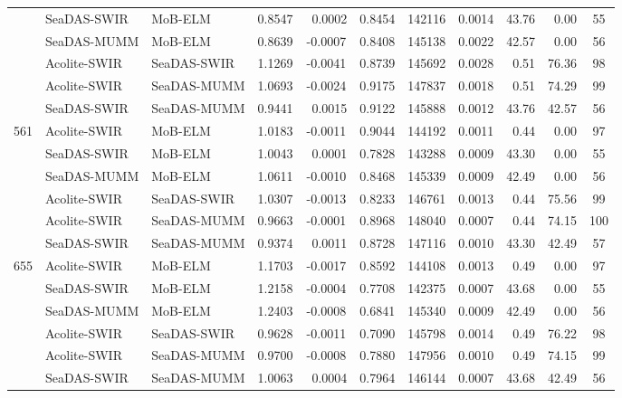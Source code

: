 \documentclass[]{spie}  %
\begin{document}
\begin{table}[!ht]
\begin{tabular}{cllcccccccc}
			&   SeaDAS-SWIR   &  MoB-ELM      &	0.8547 	&	~0.0002 &	0.8454 	&	142116  &	0.0014  &  43.76    	& ~0.00      		   &   55   	 \\
			&   SeaDAS-MUMM   &  MoB-ELM      &	0.8639 	&	-0.0007 &	0.8408 	&	145138  &	0.0022  &  42.57    	& ~0.00      		   &   56   	 \\ 
			&   Acolite-SWIR  &  SeaDAS-SWIR  &	1.1269 	&	-0.0041 &	0.8739 	&	145692  &	0.0028  &  ~0.51     	& 76.36     		   &   98   	 \\
			&   Acolite-SWIR  &  SeaDAS-MUMM  &	1.0693 	&	-0.0024 &	0.9175 	&	147837  &	0.0018  &  ~0.51     	& 74.29     		   &   99   	 \\
			&   SeaDAS-SWIR   &  SeaDAS-MUMM  &	0.9441 	&	~0.0015 &	0.9122 	&	145888  &	0.0012  &  43.76    	& 42.57     		   &   56   	 \\ \hline
\multirow{6}{*}{561}&Acolite-SWIR&  MoB-ELM   &	1.0183 	&	-0.0011 &	0.9044 	&	144192  &	0.0011  &  ~0.44     	& ~0.00      		   &   97   	 \\
	 		&   SeaDAS-SWIR   &  MoB-ELM      &	1.0043 	&	~0.0001 &	0.7828 	&	143288  &	0.0009  &  43.30    	& ~0.00      		   &   55   	 \\
	 		&   SeaDAS-MUMM   &  MoB-ELM      &	1.0611 	&	-0.0010 &	0.8468 	&	145339  &	0.0009  &  42.49    	& ~0.00      		   &   56   	 \\
	 		&   Acolite-SWIR  &  SeaDAS-SWIR  &	1.0307 	&	-0.0013 &	0.8233 	&	146761  &	0.0013  &  ~0.44     	& 75.56     		   &   99   	 \\
	 		&   Acolite-SWIR  &  SeaDAS-MUMM  &	0.9663 	&	-0.0001 &	0.8968 	&	148040  &	0.0007  &  ~0.44     	& 74.15     		   &   100  	 \\
	  		&   SeaDAS-SWIR   &  SeaDAS-MUMM  &	0.9374 	&	~0.0011 &	0.8728 	&	147116  &	0.0010  &  43.30    	& 42.49     		   &   57   	 \\ \hline
\multirow{6}{*}{655}&Acolite-SWIR&MoB-ELM     &	1.1703 	&	-0.0017 &	0.8592 	&	144108  &	0.0013  &  ~0.49     	& ~0.00      		   &   97   	 \\
	 		&   SeaDAS-SWIR   &  MoB-ELM      &	1.2158 	&	-0.0004 &	0.7708 	&	142375  &	0.0007  &  43.68    	& ~0.00      		   &   55   	 \\
	 		&   SeaDAS-MUMM   &  MoB-ELM      &	1.2403 	&	-0.0008 &	0.6841 	&	145340  &	0.0009  &  42.49    	& ~0.00      		   &   56   	 \\ 
	 		&   Acolite-SWIR  &  SeaDAS-SWIR  &	0.9628 	&	-0.0011 &	0.7090 	&	145798  &	0.0014  &  ~0.49     	& 76.22     		   &   98   	 \\
	 		&   Acolite-SWIR  &  SeaDAS-MUMM  &	0.9700 	&	-0.0008 &	0.7880 	&	147956  &	0.0010  &  ~0.49     	& 74.15     		   &   99   	 \\
	 		&   SeaDAS-SWIR   &  SeaDAS-MUMM  &	1.0063 	&	~0.0004 &	0.7964 	&	146144  &	0.0007  &  43.68    	& 42.49     		   &   56   	 \\
 \end{tabular}
\end{table}
\end{document}
